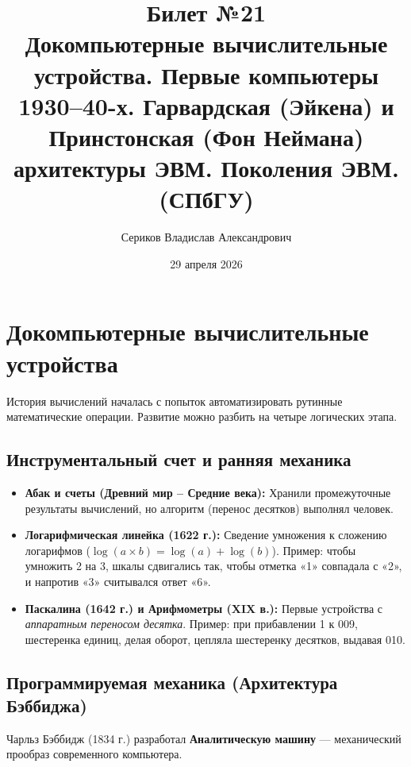 \documentclass[12pt,a4paper]{article}
\title{Билет №21 \\ \small Докомпьютерные вычислительные устройства. Первые компьютеры 1930–40-х. Гарвардская (Эйкена) и Принстонская (Фон Неймана) архитектуры ЭВМ. Поколения ЭВМ. (СПбГУ)}
\author{Сериков Владислав Александрович}
\date{29 апреля 2026}
\theoremstyle{remark}
\begin{document}
\maketitle
\tableofcontents
\newpage

\section{Докомпьютерные вычислительные устройства}
История вычислений началась с попыток автоматизировать рутинные математические операции. Развитие можно разбить на четыре логических этапа.

\subsection{Инструментальный счет и ранняя механика}
\begin{itemize}
    \item \textbf{Абак и счеты (Древний мир -- Средние века):} Хранили промежуточные результаты вычислений, но алгоритм (перенос десятков) выполнял человек.
    \item \textbf{Логарифмическая линейка (1622 г.):} Сведение умножения к сложению логарифмов ($ \log(a \times b) = \log(a) + \log(b) $). Пример: чтобы умножить 2 на 3, шкалы сдвигались так, чтобы отметка «1» совпадала с «2», и напротив «3» считывался ответ «6».
    \item \textbf{Паскалина (1642 г.) и Арифмометры (XIX в.):} Первые устройства с \textit{аппаратным переносом десятка}. Пример: при прибавлении 1 к 009, шестеренка единиц, делая оборот, цепляла шестеренку десятков, выдавая 010.
\end{itemize}

\subsection{Программируемая механика (Архитектура Бэббиджа)}
Чарльз Бэббидж (1834 г.) разработал \textbf{Аналитическую машину} — механический прообраз современного компьютера.
\end{document}
